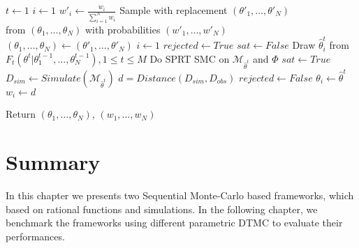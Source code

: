 \begin{algorithm}
      \begin{algorithmic}[H]
            \State $t \leftarrow 1$
            \State $i \leftarrow 1$ 
            \State $w'_i \leftarrow \frac{w_i}{\sum_{i=1}^N w_i} $
            \EndWhile
            \State Sample with replacement $(\theta'_1,\ldots,\theta'_N)$  \\\hspace{1.5cm} from $(\theta_1,\ldots,\theta_N)$ with probabilities $(w'_1,\ldots,w'_N)$
            \State $(\theta_1,\ldots,\theta_N) \leftarrow (\theta'_1,\ldots,\theta'_N)$
            \State $i \leftarrow 1$
             
            \State $rejected \leftarrow True$
            \State $sat \leftarrow False $
            \State Draw $\hat{\theta}^t_i$ from $F_t(\theta^t | \theta^{t-1}_1,\ldots,\theta^{t-1}_N), 1\leq t \leq M$
            \State Do SPRT SMC on $\mathcal{M}_{\hat{\theta}^t}$ and $\Phi$
            \State $sat \leftarrow True$
            \EndIf
            \EndWhile
            \State $D_{sim} \leftarrow Simulate(\mathcal{M}_{\hat{\theta}^t})$
            \State $d = Distance(D_{sim}, D_{obs})$
            \State $rejected \leftarrow False$
            \State $\theta_i \leftarrow \hat{\theta}^t$
            \State $w_i \leftarrow d$
            \EndIf

            \EndWhile
            \EndWhile
            \EndWhile
            \State Return $(\theta_1,\ldots,\theta_{N})$, $(w_1,\ldots,w_{N})$
            \EndProcedure
      \end{algorithmic}
\end{algorithm}

\section{Summary}
In this chapter we presents two Sequential Monte-Carlo based frameworks, which based on rational
functions and simulations. In the following chapter, we benchmark the frameworks using different
parametric DTMC to evaluate their performances.